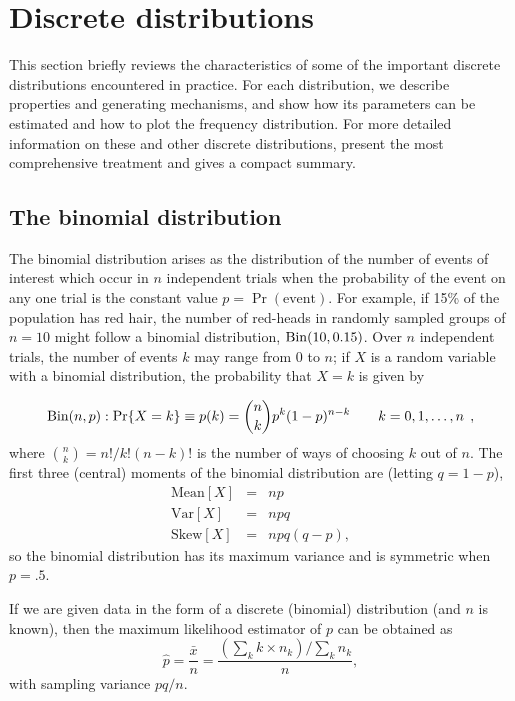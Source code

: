\section{Discrete distributions}\label{sec:discrete-distrib}
This section briefly reviews the characteristics of some of the
important discrete distributions encountered in practice.
For each distribution, we describe properties and generating
mechanisms, and show how its parameters can be estimated
and how to plot the frequency distribution.
For more detailed information on these and other discrete distributions,
\citet{Johnson-etal:92} present the most comprehensive treatment
and \citet[]{Zelterman:99} gives a compact summary.

\subsection{The binomial distribution}
The binomial distribution arises as the distribution of the
number of events of interest which occur in $n$ independent trials
when the probability of the event on any one trial is the constant
value $p = \Pr ( \textrm{event} )$.
For example, if 15\% of the population has red hair,
the number of red-heads in randomly sampled groups of $n=10$
might follow a binomial distribution, $\Bin(10, 0.15)$.
Over $n$ independent trials, the number of events  $k$
may range from 0 to $n$; if $X$ is a random variable
with a binomial distribution, the probability that $X = k$ is given
by

\begin{equation}\label{eq:binom}
\Bin(n,p): \Pr \{ X = k \} \equiv p ( k )  =
{n \choose k} p^k (1-p)^{n-k}
  \quad\quad k = 0, 1, \dots, n
  \comma
\end{equation}
where ${n \choose k} = n! / k! (n - k)!$ is the number of ways
of choosing $k$ out of $n$.
The first three (central) moments of the binomial distribution are
(letting $q = 1 - p$),
\begin{eqnarray*}
\textrm{Mean}[X] & = & n p  \\
\textrm{Var}[X] &  = & n p q \\
\textrm{Skew}[X] & = & n p q (q - p) 
\comma
\end{eqnarray*}
so the binomial distribution has its maximum variance and is
symmetric when $p = .5$.

If we are given data in the form of a discrete (binomial) distribution
(and $n$ is known),
then the maximum likelihood estimator of $p$ can be obtained
as
\begin{equation*}%
\hat{p} = \frac{\bar{x}}{n} =
  \frac{(\sum_{k} k \times n_k ) / \sum_k n_k}{n}
  \comma
\end{equation*}
with sampling variance $pq/n$.

